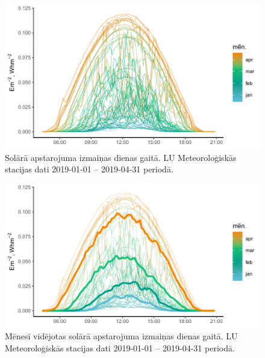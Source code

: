 \begin{figure}[h]
    \centering
    \includegraphics[width=\linewidth]{figures/meteo/sun19.pdf}
    \caption{Solārā apstarojuma izmaiņas dienas gaitā. LU Meteoroloģiskās stacijas dati 2019-01-01 -- 2019-04-31 periodā.}
    \label{fig:met_Irrad}
\end{figure}
\begin{figure}[h]
    \centering
    \includegraphics[width=\linewidth]{figures/meteo/mean19.pdf}
    \caption{Mēnesī vidējotas solārā apstarojuma izmaiņas dienas gaitā. LU Meteoroloģiskās stacijas dati 2019-01-01 -- 2019-04-31 periodā.}
    \label{fig:met_Irrad_mean}
\end{figure}